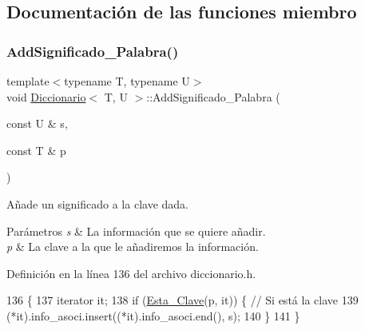\subsection{Documentación de las funciones miembro}
\mbox{\label{classDiccionario_a7e167da231bff610001df3c20cc9b7a7}} 
\subsubsection{\texorpdfstring{Add\+Significado\+\_\+\+Palabra()}{AddSignificado\_Palabra()}}
{\footnotesize\ttfamily template$<$typename T, typename U$>$ \\
void \hyperlink{classDiccionario}{Diccionario}$<$ T, U $>$\+::Add\+Significado\+\_\+\+Palabra (\begin{DoxyParamCaption}\item[{const U \&}]{s,  }\item[{const T \&}]{p }\end{DoxyParamCaption})\hspace{0.3cm}{\ttfamily [inline]}}



Añade un significado a la clave dada. 


\begin{DoxyParams}{Parámetros}
{\em s} & La información que se quiere añadir. \\
\hline
{\em p} & La clave a la que le añadiremos la información. \\
\hline
\end{DoxyParams}


Definición en la línea 136 del archivo diccionario.\+h.


\begin{DoxyCode}
136                                                         \{
137         iterator it;
138         \textcolor{keywordflow}{if} (\hyperlink{classDiccionario_a16314351b0600835ade3c7add2ffe040}{Esta\_Clave}(p, it)) \{ \textcolor{comment}{// Si está la clave}
139             (*it).info\_asoci.insert((*it).info\_asoci.end(), s);
140         \}
141     \}
\end{DoxyCode}
\mbox{\label{classDiccionario_aa17ce3d7317d78f5927ae7c0564089cc}} 
